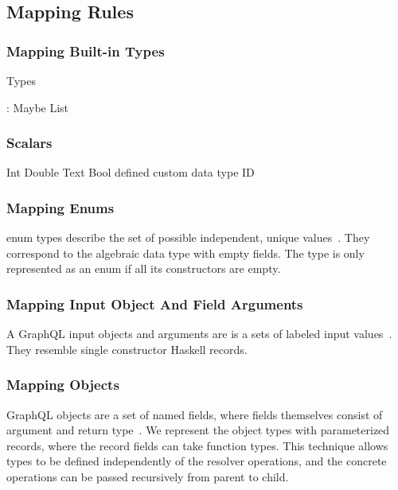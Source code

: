 
\subsection{Mapping Rules}



\begin{frame}\frametitle{Mapping Built-in Types}

\begin{block}{Types}
  \begin{itemize}
    : Maybe
     List
  \end{itemize}
\end{block}

\begin{block}\frametitle{Scalars}
\begin{itemize}
   Int
   Double
   Text
   Bool
    defined custom data type ID 
\end{itemize}
\end{block}

\end{frame}


\begin{frame}\frametitle{Mapping Enums}

enum types describe the set of possible independent, unique values~\cite{gql-spec}. They correspond to the algebraic data type with empty fields. The type is only represented as an enum if all its constructors are empty.


\end{frame}

\begin{frame}\frametitle{Mapping Input Object And Field Arguments}

A GraphQL input objects and arguments are is a sets of labeled input values~\cite{gql-spec}. They resemble single constructor Haskell records. 


\end{frame}
\begin{frame}[allowframebreaks]\frametitle{Mapping Objects}

GraphQL objects are a set of named fields, where fields themselves consist of argument and return type~\cite{gql-spec}. We represent the object types with parameterized records, where the record fields can take function types. This technique allows types to be defined independently of the resolver operations, and the concrete operations can be passed recursively from parent to child. 



\end{frame}

